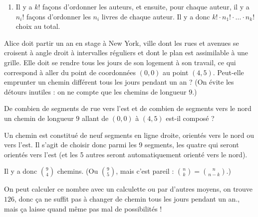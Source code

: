 \begin{exo}
\begin{sol}
\begin{enumerate}
\item Il y a $k!$ façons d'ordonner les auteurs, et ensuite, pour chaque auteur, il y a $n_i!$ façons d'ordonner les $n_i$ livres de chaque auteur. Il y a donc $k! \cdot n_1!\cdot ... \cdot n_k!$ choix au total.
\end{enumerate}
\end{sol}
\end{exo}

\begin{exo}
Alice doit partir un an en stage à New York, ville dont les rues et avenues se croisent à angle droit à intervalles réguliers et dont le plan est assimilable à une grille. Elle doit se rendre tous les jours de son logement à son travail, ce qui correspond à aller du point de coordonnées $(0,0)$ au point $(4,5)$. Peut-elle emprunter un chemin différent tous les jours pendant un an ? (On évite les détours inutiles : on ne compte que les chemins \og de longueur $9$\fg{}.)

\begin{hint} %
De combien de segments de rue \og vers l'est \fg{} et de combien de segments \og vers le nord \fg{} un chemin de longueur $9$ allant de $(0,0)$ à $(4,5)$ est-il composé ? 
\end{hint}

\begin{sol} %
Un chemin est constitué de neuf segments en ligne droite, orientés vers le nord ou vers l'est. Il s'agit de choisir donc parmi les 9 segments, les quatre qui seront orientés vers l'est (et les 5 autres seront automatiquement orienté vers le nord).

Il y a donc $\binom{9}{4}$ chemins. (Ou $\binom{9}{5}$, mais c'est pareil : $\binom{n}{k} = \binom{n}{n-k}$.)

On peut calculer ce nombre avec un calculette ou par d'autres moyens, on trouve $126$, donc ça ne suffit pas à changer de chemin tous les jours pendant un an., mais ça laisse quand même pas mal de possibilités !

\end{sol}
\end{exo}

